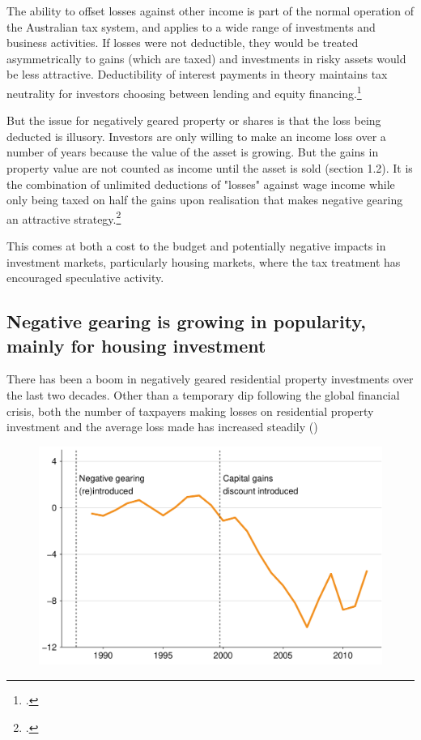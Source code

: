 \documentclass{grattan}\usepackage[]{graphicx}\usepackage[]{color}
\begin{document}
The ability to offset losses against other income is part of the normal operation of the Australian tax system, and applies to a wide range of investments and business activities. If losses were not deductible, they would be treated asymmetrically to gains (which are taxed) and investments in risky assets would be less attractive. Deductibility of interest payments in theory maintains tax neutrality for investors choosing between lending and equity financing.\footcite{Fane2004}  


But the issue for negatively geared property or shares is that the loss being deducted is illusory. Investors are only willing to make an income loss over a number of years because the value of the asset is growing. But the gains in property value are not counted as income until the asset is sold (section 1.2). It is the combination of unlimited deductions of "losses" against wage income while only being taxed on half the gains upon realisation that makes negative gearing an attractive strategy.\footcite[pages~5,13]{ACOSS} 

This comes at both a cost to the budget and potentially negative impacts in investment markets, particularly housing markets, where the tax treatment has encouraged speculative activity. 

\subsection{Negative gearing is growing in popularity, mainly for housing investment}
There has been a boom in negatively geared residential property investments over the last two decades. Other than a temporary dip following the global financial crisis, both the number of taxpayers making losses on residential property investment and the average loss made has increased steadily ()




\begin{figure}
\includegraphics[width=\columnwidth]{figure/Net_rent_over_time-1}

\end{figure}
\end{document}
